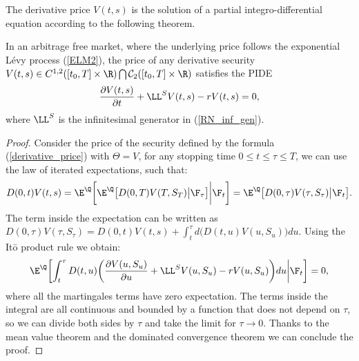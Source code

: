 The derivative price $V(t,s)$ is the solution of a partial integro-differential equation according to the following theorem.
\begin{Theorem}
 In an arbitrage free market, where the underlying price follows the exponential Lévy process (\ref{ELM2}),
 the price of any derivative security $V(t,s) \in C^{1,2}([t_0,T] \times \R) \bigcap \mathcal{C}_2([t_0,T] \times \R) $ 
 satisfies the PIDE
\begin{equation}\label{derivative_PIDE}
 \frac{\partial V(t,s)}{\partial t} + \LL^{S} V(t,s) -r V(t,s) = 0,   
\end{equation}
where $\LL^S$ is the infinitesimal generator in (\ref{RN_inf_gen}). 
\end{Theorem}
\begin{proof}
 Consider the price of the security defined by the formula 
 (\ref{derivative_price}) with $\varTheta = V$, for any stopping time $0 \leq t \leq \tau \leq T$, we can use the law of iterated expectations, such that:
 $$ D(0,t) V(t,s) = \E^{\Q}  \biggl[ \E^{\Q} \bigl[ D(0,T) V(T,S_T) \big| \F_{\tau} \bigr] \bigg| \F_t \biggr] = \E^{\Q} \bigl[ D(0,\tau) V(\tau,S_{\tau}) \big| \F_t \bigr]. $$
 The term inside the expectation can be written as $D(0,\tau) V(\tau,S_{\tau}) = D(0,t) V(t,s) + \int_t^{\tau} d\bigl(D(t,u) V(u,S_u)\bigr) du$. Using the It\=o product rule we obtain:
 $$ \E^{\Q} \biggl[ \int_t^{\tau} D(t,u) \biggl( \frac{\partial V(u,S_u)}{\partial u} + \LL^{S} V(u,S_u) -r V(u,S_u) \biggr) du \bigg| \F_t \biggr] = 0, $$
 where all the martingales terms have zero expectation. The terms inside the integral are all continuous and bounded by a function that does not depend on $\tau$, 
 so we can divide both sides by $\tau$ and take the limit for 
 $\tau \to 0$. Thanks to the mean value theorem and the dominated convergence theorem we can conclude the proof.
\end{proof}













